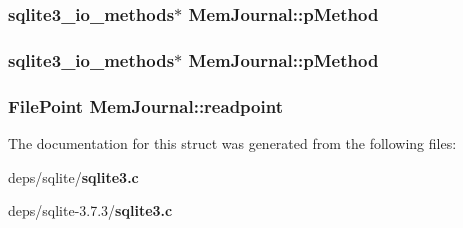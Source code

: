 \subsubsection{\setlength{\rightskip}{0pt plus 5cm}\bf{sqlite3\_\-io\_\-methods}$\ast$ \bf{Mem\-Journal::p\-Method}}\label{structMemJournal_886d2c783f71ffd2eff37b325642f8ff}


\subsubsection{\setlength{\rightskip}{0pt plus 5cm}\bf{sqlite3\_\-io\_\-methods}$\ast$ \bf{Mem\-Journal::p\-Method}}\label{structMemJournal_886d2c783f71ffd2eff37b325642f8ff}


\subsubsection{\setlength{\rightskip}{0pt plus 5cm}\bf{File\-Point} \bf{Mem\-Journal::readpoint}}\label{structMemJournal_d2cfda73ca354e1fa6ddff08047d87cc}




The documentation for this struct was generated from the following files:\begin{CompactItemize}
\item 
deps/sqlite/\bf{sqlite3.c}\item 
deps/sqlite-3.7.3/\bf{sqlite3.c}\end{CompactItemize}
